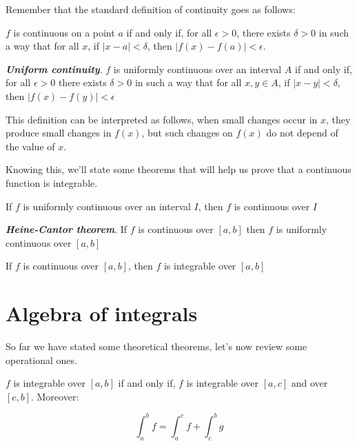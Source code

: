 \documentclass{report}
\begin{document}
    \begin{noteBox}
        Remember that the standard definition of continuity goes as follows:

        $f$ is continuous on a point $a$ if and only if, for all $\epsilon > 0$, there exists $\delta > 0$ in such a way that for all $x$, if $|x-a|<\delta$, then $|f(x) -f(a)| < \epsilon$.
    \end{noteBox}
    \begin{defBox}
        \textit{\textbf{Uniform continuity}}. $f$ is uniformly continuous over an interval $A$ if and only if, for all $\epsilon > 0$ there exists $\delta > 0$ in such a way that for all $x, y \in A$, if $|x-y| < \delta$, then $|f(x) - f(y)| < \epsilon$
    \end{defBox}

    This definition can be interpreted as follows, when small changes occur in $x$, they produce small changes in $f(x)$, but such changes on $f(x)$ do not depend of the value of $x$.


    Knowing this, we'll state some theorems that will help us prove that a continuous function is integrable.

    \begin{thBox}
        If $f$ is uniformly continuous over an interval $I$, then $f$ is continuous over $I$
    \end{thBox}

    \begin{thBox}
        \textit{\textbf{Heine-Cantor theorem}}. If $f$ is continuous over $[a,b]$ then $f$ is uniformly continuous over $[a,b]$
    \end{thBox}

    \begin{thBox}
        If $f$ is continuous over $[a,b]$, then $f$ is integrable over $[a,b]$
    \end{thBox}


    \section{Algebra of integrals}

    So far we have stated some theoretical theorems, let's now review some operational ones.

    \begin{thBox}
        $f$ is integrable over $[a,b]$ if and only if, $f$ is integrable over $[a,c]$ and over $[c,b]$. Moreover:

        $$\int_{a}^{b}f = \int_{a}^{c}f + \int_{c}^{b}g$$
    \end{thBox}
\end{document}
